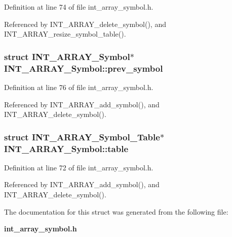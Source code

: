 Definition at line 74 of file int\_\-array\_\-symbol.h.

Referenced by INT\_\-ARRAY\_\-delete\_\-symbol(), and INT\_\-ARRAY\_\-resize\_\-symbol\_\-table().
\subsubsection{\setlength{\rightskip}{0pt plus 5cm}struct \bf{INT\_\-ARRAY\_\-Symbol}$\ast$ \bf{INT\_\-ARRAY\_\-Symbol::prev\_\-symbol}}\label{structINT__ARRAY__Symbol_0230ee3c4e5c70d73457d079781643aa}




Definition at line 76 of file int\_\-array\_\-symbol.h.

Referenced by INT\_\-ARRAY\_\-add\_\-symbol(), and INT\_\-ARRAY\_\-delete\_\-symbol().
\subsubsection{\setlength{\rightskip}{0pt plus 5cm}struct \bf{INT\_\-ARRAY\_\-Symbol\_\-Table}$\ast$ \bf{INT\_\-ARRAY\_\-Symbol::table}}\label{structINT__ARRAY__Symbol_79f3de217b69f60a720080e5161d2c68}




Definition at line 72 of file int\_\-array\_\-symbol.h.

Referenced by INT\_\-ARRAY\_\-add\_\-symbol(), and INT\_\-ARRAY\_\-delete\_\-symbol().

The documentation for this struct was generated from the following file:\begin{CompactItemize}
\item 
\bf{int\_\-array\_\-symbol.h}\end{CompactItemize}
